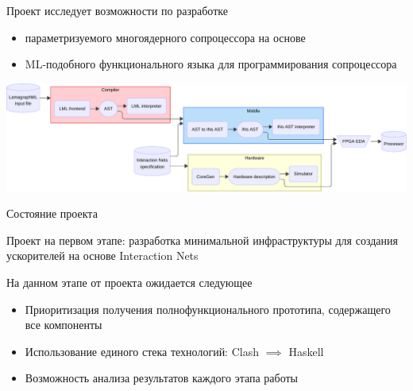 \documentclass
  [ russian
  , aspectratio=169 %
  ] {beamer}
\begin{document}
\begin{frame}{\Lamagraph{}}

    Проект \Lamagraph{} исследует возможности по разработке
    \begin{itemize}
        \item параметризуемого многоядерного сопроцессора на основе \INs{}
        \item ML-подобного функционального языка для программирования сопроцессора
    \end{itemize}
    \begin{center}
        \includegraphics[width=\linewidth]{figures/lamagraph-big-horiz.pdf}
    \end{center}

\end{frame}

\begin{frame}{Состояние проекта}

    Проект на первом этапе: разработка минимальной инфраструктуры для создания ускорителей на основе Interaction Nets

    \vspace{1em}

    На данном этапе от проекта ожидается следующее
    \begin{itemize}
        \item Приоритизация получения полнофункционального прототипа, содержащего все компоненты
        \item Использование единого стека технологий: Clash $\implies$ Haskell
        \item Возможность анализа результатов каждого этапа работы
    \end{itemize}

\end{frame}
\end{document}
